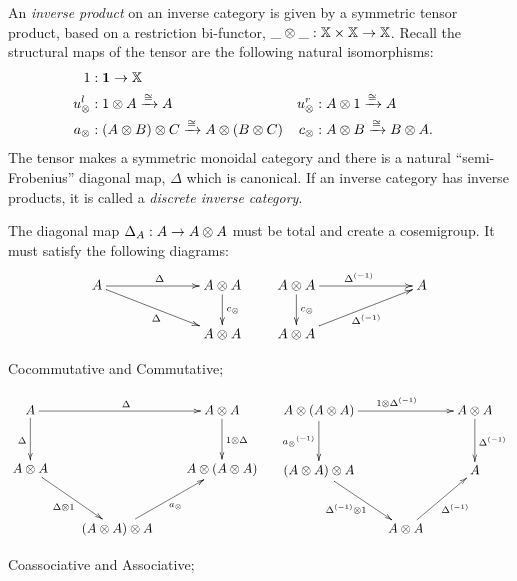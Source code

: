\begin{definition}\label{def:inverse_product}
  An \emph{inverse product} on an inverse category \X is given by a symmetric tensor product, based
  on a restriction  bi-functor, $\_\otimes\_:\mathbb{X}\times\mathbb{X} \to \mathbb{X}$. Recall the structural maps of the tensor
  are the following  natural isomorphisms:
    \begin{align*}
      1 &: \boldsymbol{1}\to \mathbb{X} \\
      u_{\otimes}^l &: 1 \otimes A \xrightarrow{\cong} A
      &u_{\otimes}^r &: A \otimes 1 \xrightarrow{\cong} A\\
      a_{\otimes} &: (A \otimes B) \otimes C \xrightarrow{\cong} A \otimes (B \otimes C)
      &c_{\otimes} &: A \otimes B \xrightarrow{\cong} B \otimes A.
    \end{align*}The tensor makes \X a  symmetric
  monoidal category and there is a natural  ``semi-Frobenius'' diagonal map, $\Delta$ which is canonical.   If an
  inverse category has inverse products, it is called  a \emph{discrete inverse category}.


  The diagonal map $\Delta_A:A \to A\otimes A$ must be total and create a cosemigroup. It
  must satisfy the following diagrams:
  \[
    \xymatrix @!0 @C=90pt @R=35pt{
      A \ar[dr]_{\Delta} \ar[r]^{\Delta} &
      A \* A \ar[d]^{c_{\*}}\\
      & A \* A
    }\qquad
    \xymatrix @!0 @C=90pt @R=35pt{
      A \* A \ar[d]^{c_{\*}} \ar[r]^{\inv{\Delta}}  & A\\
      A \* A  \ar[ur]_{\inv{\Delta}}
    }
  \]
\begin{center}Cocommutative and Commutative;\end{center}

  \[
    \xymatrix @C=20pt @R=30pt{
      A \ar[rr]^{\Delta} \ar[d]_{\Delta} & &
      A \* A \ar[d]^{1\*\Delta}\\
      A\*A \ar[dr]_{\Delta \* 1}& &
      A \* ( A \* A) \\
      &   (A \* A) \* A \ar[ur]_{a_{\*}}
    }\ \quad
    \xymatrix @C=20pt @R=30pt{
      A\*(A\*A) \ar[rr]^{1\*\idelta} \ar[d]_{\inv{a_\*}} && A\*A \ar[d]^{\idelta}\\
      (A\*A)\*A \ar[dr]_{\idelta\*1}&&A\\
     & A\*A \ar[ur]_{\idelta}
    }
  \]
\begin{center}Coassociative and Associative;\end{center}


\end{definition}
